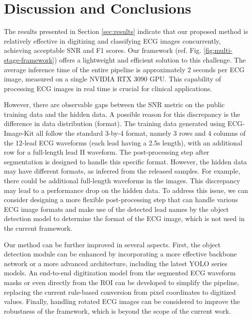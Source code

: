 \section{Discussion and Conclusions}
\label{sec:discu}


The results presented in Section \ref{sec:results} indicate that our proposed method is relatively effective in digitizing and classifying ECG images concurrently, achieving acceptable SNR and F1 scores. Our framework (ref. Fig. \ref{fig:multi-stage-framework}) offers a lightweight and efficient solution to this challenge. The average inference time of the entire pipeline is approximately 2 seconds per ECG image, measured on a single NVIDIA RTX 3090 GPU. This capability of processing ECG images in real time is crucial for clinical applications.

However, there are observable gaps between the SNR metric on the public training data and the hidden data. A possible reason for this discrepancy is the difference in data distribution (format). The training data generated using ECG-Image-Kit \cite{Shivashankara_2024_ECG, ECGImageKit2024_GitHub} all follow the standard 3-by-4 format, namely 3 rows and 4 columns of the 12-lead ECG waveforms (each lead having a 2.5s length), with an additional row for a full-length lead II waveform. The post-processing step after segmentation is designed to handle this specific format. However, the hidden data may have different formats, as inferred from the released samples. For example, there could be additional full-length waveforms in the images. This discrepancy may lead to a performance drop on the hidden data. To address this issue, we can consider designing a more flexible post-processing step that can handle various ECG image formats and make use of the detected lead names by the object detection model to determine the format of the ECG image, which is not used in the current framework.

Our method can be further improved in several aspects. First, the object detection module can be enhanced by incorporating a more effective backbone network or a more advanced architecture, including the latest YOLO series models. An end-to-end digitization model from the segmented ECG waveform masks or even directly from the ROI can be developed to simplify the pipeline, replacing the current rule-based conversion from pixel coordinates to digitized values. Finally, handling rotated ECG images can be considered to improve the robustness of the framework, which is beyond the scope of the current work.

